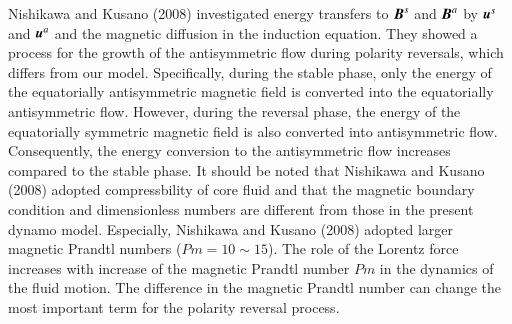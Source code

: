 Nishikawa and Kusano (2008) %
investigated energy transfers to $\mbox{\boldmath$B$}^s$ and $\mbox{\boldmath$B$}^a$ by $\mbox{\boldmath$u$}^s$ and $\mbox{\boldmath$u$}^a$ and the magnetic diffusion in the induction equation.
They showed a process for the growth of the antisymmetric flow during polarity reversals, which differs from our model.
Specifically, during the stable phase, only the energy of the equatorially antisymmetric magnetic field is converted into the equatorially antisymmetric flow. However, during the reversal phase, the energy of the equatorially symmetric magnetic field is also converted into antisymmetric flow. Consequently, the energy conversion to the antisymmetric flow increases compared to the stable phase.
It should be noted that Nishikawa and Kusano (2008) adopted compressbility of core fluid and that the magnetic boundary condition and dimensionless numbers are different from those in the present dynamo model.
Especially, Nishikawa and Kusano (2008) adopted larger magnetic Prandtl numbers ($Pm = 10 \sim 15$). 
The role of the Lorentz force increases with increase of the magnetic Prandtl number $Pm$ in the dynamics of the fluid motion.
The difference in the magnetic Prandtl number can change the most important term for the polarity reversal process. 


